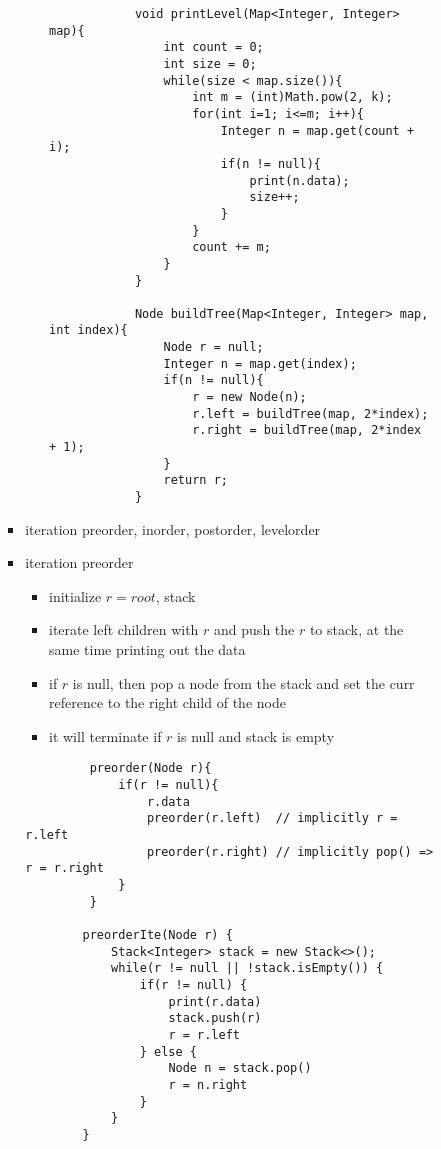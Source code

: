 \documentclass{article}
\begin{document}
\begin{enumerate}
\begin{itemize}
\begin{itemize}
\begin{itemize}
\begin{itemize}
\begin{verbatim}
            void printLevel(Map<Integer, Integer> map){
                int count = 0;
                int size = 0;
                while(size < map.size()){
                    int m = (int)Math.pow(2, k);
                    for(int i=1; i<=m; i++){
                        Integer n = map.get(count + i);
                        if(n != null){
                            print(n.data);
                            size++;
                        }
                    }
                    count += m;
                }
            }

            Node buildTree(Map<Integer, Integer> map, int index){
                Node r = null;
                Integer n = map.get(index);
                if(n != null){
                    r = new Node(n);
                    r.left = buildTree(map, 2*index);
                    r.right = buildTree(map, 2*index + 1);
                }
                return r;
            }
         \end{verbatim} 
        \end{itemize}

        \item iteration preorder, inorder, postorder, levelorder
        \item iteration preorder
        \begin{itemize}
        \item initialize $r = root$, stack
        \item iterate left children with $r$ and push the $r$ to stack, at the same time printing out the data 
        \item if $r$ is null, then pop a node from the stack and set the curr reference to the right child of the node 
        \item it will terminate if $r$ is null and stack is empty
        \end{itemize}
         \begin{verbatim}
         preorder(Node r){
             if(r != null){
                 r.data
                 preorder(r.left)  // implicitly r = r.left
                 preorder(r.right) // implicitly pop() => r = r.right
             }
         }

        preorderIte(Node r) {
            Stack<Integer> stack = new Stack<>();
            while(r != null || !stack.isEmpty()) {
                if(r != null) {
                    print(r.data)
                    stack.push(r)
                    r = r.left
                } else {
                    Node n = stack.pop()
                    r = n.right
                }
            }
        }
        \end{verbatim} 


\end{itemize}
\end{itemize}
\end{itemize}
\end{enumerate}
\end{document}
